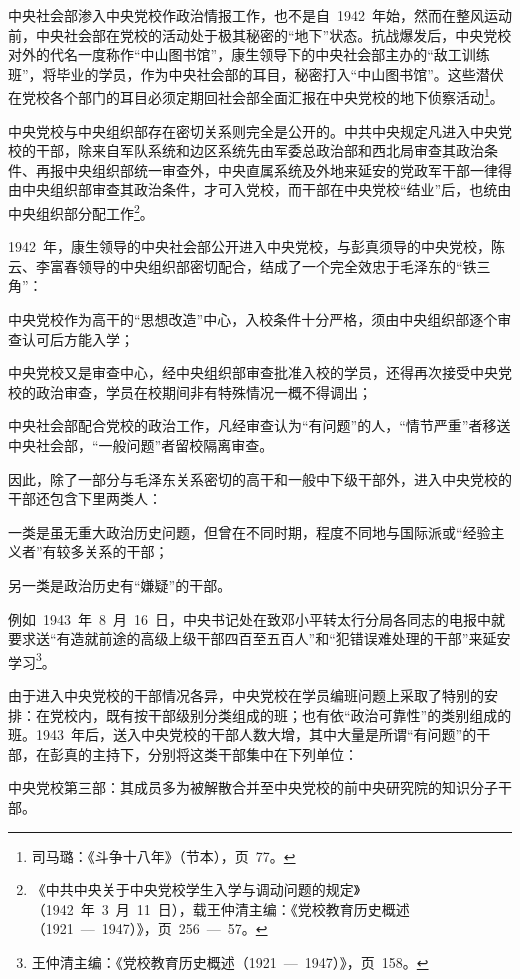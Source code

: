 中央社会部渗入中央党校作政治情报工作，也不是自~1942~年始，然而在整风运动前，中央社会部在党校的活动处于极其秘密的“地下”状态。抗战爆发后，中央党校对外的代名一度称作“中山图书馆”，康生领导下的中央社会部主办的“敌工训练班”，将毕业的学员，作为中央社会部的耳目，秘密打入“中山图书馆”。这些潜伏在党校各个部门的耳目必须定期回社会部全面汇报在中央党校的地下侦察活动\footnote{司马璐：《斗争十八年》（节本），页~77。}。

中央党校与中央组织部存在密切关系则完全是公开的。中共中央规定凡进入中央党校的干部，除来自军队系统和边区系统先由军委总政治部和西北局审查其政治条件、再报中央组织部统一审查外，中央直属系统及外地来延安的党政军干部一律得由中央组织部审查其政治条件，才可入党校，而干部在中央党校“结业”后，也统由中央组织部分配工作\footnote{《中共中央关于中央党校学生入学与调动问题的规定》（1942~年~3~月~11~日），载王仲清主编：《党校教育历史概述（1921~—~1947）》，页~256~—~57。}。

1942~年，康生领导的中央社会部公开进入中央党校，与彭真须导的中央党校，陈云、李富春领导的中央组织部密切配合，结成了一个完全效忠于毛泽东的“铁三角”：

中央党校作为高干的“思想改造”中心，入校条件十分严格，须由中央组织部逐个审查认可后方能入学；

中央党校又是审查中心，经中央组织部审查批准入校的学员，还得再次接受中央党校的政治审查，学员在校期间非有特殊情况一概不得调出；

中央社会部配合党校的政治工作，凡经审查认为“有问题”的人，“情节严重”者移送中央社会部，“一般问题”者留校隔离审查。

因此，除了一部分与毛泽东关系密切的高干和一般中下级干部外，进入中央党校的干部还包含下里两类人：

一类是虽无重大政治历史问题，但曾在不同时期，程度不同地与国际派或“经验主义者”有较多关系的干部；

另一类是政治历史有“嫌疑”的干部。

例如~1943~年~8~月~16~日，中央书记处在致邓小平转太行分局各同志的电报中就要求送“有造就前途的高级上级干部四百至五百人”和“犯错误难处理的干部”来延安学习\footnote{王仲清主编：《党校教育历史概述（1921~—~1947）》，页~158。}。

由于进入中央党校的干部情况各异，中央党校在学员编班问题上采取了特别的安排：在党校内，既有按干部级别分类组成的班；也有依“政治可靠性”的类别组成的班。1943~年后，送入中央党校的干部人数大增，其中大量是所谓“有问题”的干部，在彭真的主持下，分别将这类干部集中在下列单位：

中央党校第三部：其成员多为被解散合并至中央党校的前中央研究院的知识分子干部。

